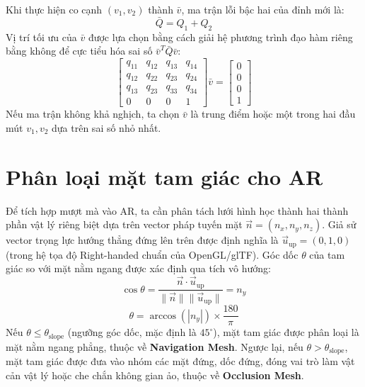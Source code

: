 \documentclass[a4paper,12pt]{report}
\begin{document}
Khi thực hiện co cạnh $(v_1, v_2)$ thành $\bar{v}$, ma trận lỗi bậc hai của đỉnh mới là:
\begin{equation}
    \bar{Q} = Q_1 + Q_2
\end{equation}
Vị trí tối ưu của $\bar{v}$ được lựa chọn bằng cách giải hệ phương trình đạo hàm riêng bằng không để cực tiểu hóa sai số $\bar{v}^T \bar{Q} \bar{v}$:
\begin{equation}
    \begin{bmatrix}
    q_{11} & q_{12} & q_{13} & q_{14} \\
    q_{12} & q_{22} & q_{23} & q_{24} \\
    q_{13} & q_{23} & q_{33} & q_{34} \\
    0 & 0 & 0 & 1
    \end{bmatrix} \bar{v} = \begin{bmatrix} 0 \\ 0 \\ 0 \\ 1 \end{bmatrix}
\end{equation}
Nếu ma trận không khả nghịch, ta chọn $\bar{v}$ là trung điểm hoặc một trong hai đầu mút $v_1, v_2$ dựa trên sai số nhỏ nhất.

\section{Phân loại mặt tam giác cho AR}
Để tích hợp mượt mà vào AR, ta cần phân tách lưới hình học thành hai thành phần vật lý riêng biệt dựa trên vector pháp tuyến mặt $\vec{n} = (n_x, n_y, n_z)$.
Giả sử vector trọng lực hướng thẳng đứng lên trên được định nghĩa là $\vec{u}_{\text{up}} = (0, 1, 0)$ (trong hệ tọa độ Right-handed chuẩn của OpenGL/glTF). Góc dốc $\theta$ của tam giác so với mặt nằm ngang được xác định qua tích vô hướng:
\begin{equation}
    \cos\theta = \frac{\vec{n} \cdot \vec{u}_{\text{up}}}{\|\vec{n}\| \|\vec{u}_{\text{up}}\|} = n_y
\end{equation}
\begin{equation}
    \theta = \arccos(|n_y|) \times \frac{180}{\pi}
\end{equation}
Nếu $\theta \le \theta_{\text{slope}}$ (ngưỡng góc dốc, mặc định là $45^\circ$), mặt tam giác được phân loại là mặt nằm ngang phẳng, thuộc về \textbf{Navigation Mesh}.
Ngược lại, nếu $\theta > \theta_{\text{slope}}$, mặt tam giác được đưa vào nhóm các mặt đứng, dốc đứng, đóng vai trò làm vật cản vật lý hoặc che chắn không gian ảo, thuộc về \textbf{Occlusion Mesh}.
\end{document}
